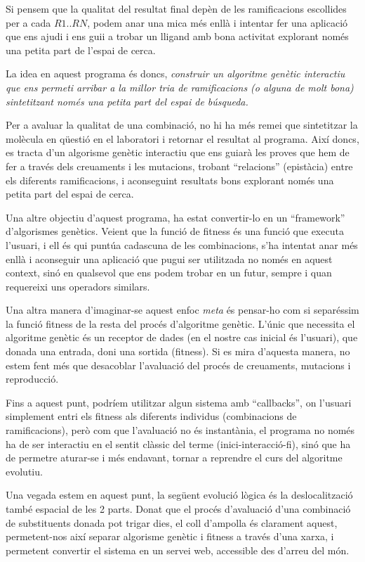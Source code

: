 	Si pensem que la qualitat del resultat final depèn de les
	ramificacions escollides per a cada $R1..RN$, podem anar una mica més enllà i
	intentar fer una aplicació que ens ajudi i ens guii a trobar un lligand amb
	bona activitat explorant només una petita part de l'espai de cerca.
	
	La idea en aquest programa és doncs, \emph{construir un algoritme genètic
	interactiu que ens permeti arribar a la millor tria de ramificacions (o
	alguna de molt bona) sintetitzant només una petita part del espai de
	búsqueda.}

	Per a avaluar la qualitat de una combinació, no hi ha més remei que
	sintetitzar la molècula en qüestió en el laboratori i retornar el resultat
	al programa.  Així doncs, es tracta d'un algorisme genètic interactiu que
	ens guiarà les proves que hem de fer a través dels creuaments i les
	mutacions, trobant ``relacions'' (epistàcia) entre els diferents
	ramificacions, i aconseguint resultats bons explorant només una petita part
	del espai de cerca.

	Una altre objectiu d'aquest programa, ha estat convertir-lo en un
	``framework'' d'algorismes genètics.  Veient que la funció de fitness és una
	funció que executa l'usuari, i ell és qui puntúa cadascuna de les
	combinacions, s'ha intentat anar més enllà i aconseguir una aplicació que
	pugui ser utilitzada no només en aquest context, sinó en qualsevol que ens
	podem trobar en un futur, sempre i quan requereixi uns operadors similars.

	Una altra manera d'imaginar-se aquest enfoc \emph{meta} és pensar-ho com si
	separéssim la funció fitness de la resta del procés d'algoritme genètic.
	L'únic que necessita el algoritme genètic és un receptor de dades (en el
	nostre cas inicial és l'usuari), que donada una entrada, doni una
	sortida (fitness).  Si es mira d'aquesta manera, no estem fent més que
	desacoblar l'avaluació del procés de creuaments, mutacions i reproducció.

	Fins a aquest punt, podríem utilitzar algun sistema amb ``callbacks'', on
	l'usuari simplement entri els fitness als diferents individus (combinacions
	de ramificacions), però com que l'avaluació no és instantània, el programa no
	només ha de ser interactiu en el sentit clàssic del terme (inici-interacció-fi),
	sinó que ha de permetre aturar-se i més endavant, tornar a reprendre el curs
	del algoritme evolutiu. 

	Una vegada estem en aquest punt, la següent evolució lògica és la
	deslocalització també espacial de les 2 parts.  Donat que el procés
	d'avaluació d'una combinació de substituents donada pot trigar dies, el coll
	d'ampolla és clarament aquest, permetent-nos així separar algorisme
	genètic i fitness a través d'una xarxa, i permetent convertir el sistema en
	un servei web, accessible des d'arreu del món.


